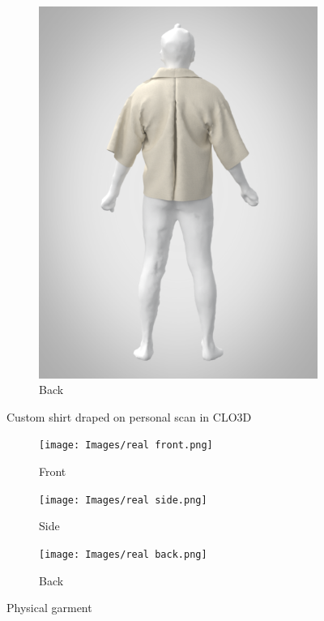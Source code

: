 \begin{figure}[H]
\begin{subfigure}[b]{0.3\textwidth}
        \includegraphics[width=\textwidth]{Images/render backpng.png}
        \caption{Back}
    \end{subfigure}
    \caption{Custom shirt draped on personal scan in CLO3D}
    \label{fig:renderedCLO}
\end{figure}

\begin{figure}[H]
    \centering
    \begin{subfigure}[b]{0.3\textwidth}
        \centering
        \texttt{[image: Images/real front.png]}
        \caption{Front}
    \end{subfigure}
    \hfill
    \begin{subfigure}[b]{0.3\textwidth}
        \centering
        \texttt{[image: Images/real side.png]}
        \caption{Side}
    \end{subfigure}
    \hfill
    \begin{subfigure}[b]{0.3\textwidth}
        \centering
        \texttt{[image: Images/real back.png]}
        \caption{Back}
    \end{subfigure}
    \caption{Physical garment}
    \label{fig:personal_garment}
\end{figure}